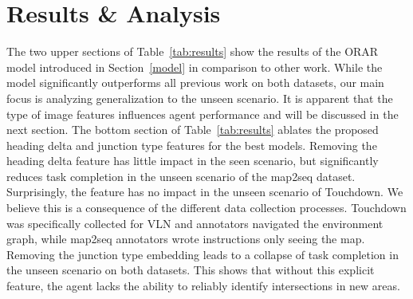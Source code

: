\documentclass[11pt]{article}
\begin{document}
\section{Results \& Analysis}
The two upper sections of Table~\ref{tab:results} show the results of the ORAR model introduced in Section~\ref{model} in comparison to other work. While the model significantly outperforms all previous work on both datasets, our main focus is analyzing generalization to the unseen scenario. It is apparent that the type of image features influences agent performance and will be discussed in the next section. The bottom section of Table~\ref{tab:results} ablates the proposed heading delta and junction type features for the best models. Removing the heading delta feature has little impact in the seen scenario, but significantly reduces task completion in the unseen scenario of the map2seq dataset. Surprisingly, the feature has no impact in the unseen scenario of Touchdown. We believe this is a consequence of the different data collection processes. Touchdown was specifically collected for VLN and annotators navigated the environment graph, while map2seq annotators wrote instructions only seeing the map. Removing the junction type embedding leads to a collapse of task completion in the unseen scenario on both datasets. This shows that without this explicit feature, the agent lacks the ability to reliably identify intersections in new areas. 
\end{document}
